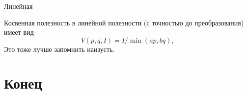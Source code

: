 \documentclass{beamer}
\begin{document}
\begin{frame}{Линейная}

Косвенная полезность в линейной полезности (с точностью до преобразования) имеет вид
$$V(p,q,I) = I / \min(ap, bq),$$
Это тоже лучше запомнить наизусть.
\end{frame}



\section{Конец}
\end{document}
